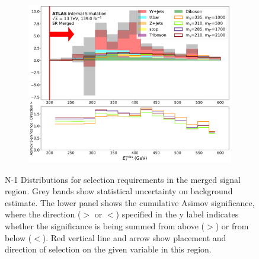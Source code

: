 \begin{figure}[htbp]
\begin{subfigure}[t]{0.48\textwidth}
     \includegraphics[width = 0.99\textwidth]{Figures/5/SR1L_Merged/MetTST_met_N_1.pdf}
    \caption{\met}
    \end{subfigure}
   \caption{N-1 Distributions for selection requirements in the merged signal region. Grey bands show statistical uncertainty on background estimate. The lower panel shows the cumulative Asimov significance, where the direction (\(>\) or \(<\)) specified in the y label indicates whether the significance is being summed from above (\(>\)) or from below (\(<\)). Red vertical line and arrow show placement and direction of selection on the given variable in this region.}
   \label{fig:Nminus1mergedSR}
\end{figure}
